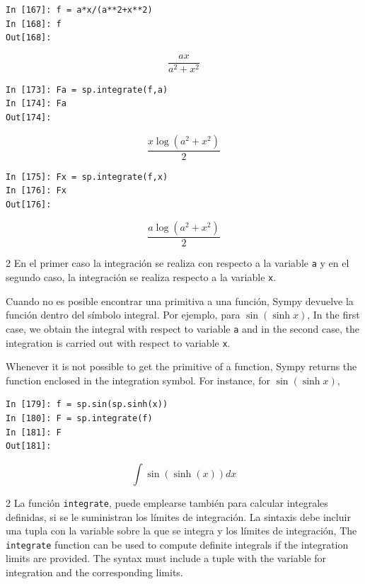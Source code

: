 \begin{center}
	\begin{minipage}{.5\textwidth}
		\begin{verbatim}
In [167]: f = a*x/(a**2+x**2)
In [168]: f
Out[168]: 
		\end{verbatim}
		\begin{equation*}
			\frac{ax}{a^2+x^2}
		\end{equation*}
		\begin{verbatim}
In [173]: Fa = sp.integrate(f,a)
In [174]: Fa
Out[174]: 
		\end{verbatim}
		\begin{equation*}
			\frac{x\log(a^2+x^2)}{2}
		\end{equation*}
				\begin{verbatim}
In [175]: Fx = sp.integrate(f,x)
In [176]: Fx
Out[176]:
		\end{verbatim}
		\begin{equation*}
			\frac{a\log(a^2+x^2)}{2}
		\end{equation*}
	\end{minipage}
\end{center}
\begin{paracol}{2}
En el primer caso la integración se realiza con respecto a la variable \texttt{a} y en el segundo caso, la integración se realiza respecto a la variable \texttt{x}.

Cuando no es posible encontrar una primitiva a una función, Sympy devuelve la función dentro del símbolo integral. Por ejemplo, para $\sin(\sinh x)$,
\switchcolumn
In the first case, we obtain the integral with respect to variable \texttt{a} and in the second case, the integration is carried out with respect to variable \texttt{x}. 

Whenever it is not possible to get the primitive of a function, Sympy returns the function enclosed in the integration symbol. For instance, for $\sin(\sinh x)$,
\end{paracol}
\begin{center}
	\begin{minipage}{.5\textwidth}
		\begin{verbatim}
In [179]: f = sp.sin(sp.sinh(x))
In [180]: F = sp.integrate(f)
In [181]: F
Out[181]:  
		\end{verbatim}
		\begin{equation*}\int \sin(\sinh(x))dx \end{equation*}
	\end{minipage}
\end{center}
\begin{paracol}{2}
La función \texttt{integrate}, puede emplearse también para calcular integrales definidas, si se le suministran los límites de integración. La sintaxis debe incluir una tupla con la variable sobre la que se integra y los límites de integración,
\switchcolumn
The \texttt{integrate} function can be used to compute definite integrals if the integration limits are provided. The syntax must include a tuple with the variable for integration and the corresponding limits.
\end{paracol}

